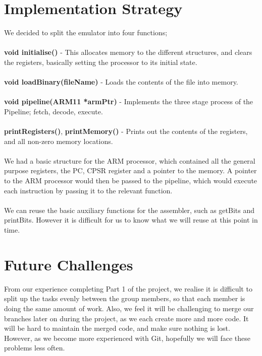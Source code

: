 \documentclass[11pt]{article}
\begin{document}
\section{Implementation Strategy}

We decided to split the emulator into four functions;
\\
\\
\noindent \textbf{void initialise()} - This allocates memory to the different structures, and clears the registers, basically setting the processor to its initial state.
\\
\\
\noindent\textbf{void loadBinary(fileName)} - Loads the contents of the file into memory.
\\
\\
\noindent \textbf{void pipeline(ARM11 *armPtr)} - Implements the three stage process of the Pipeline; fetch, decode, execute.
\\
\\
\noindent \textbf{printRegisters()}, \textbf{printMemory()} - Prints out the contents of the registers, and all non-zero memory locations.
\\
\\
We had a basic structure for the ARM processor, which contained all the general purpose registers, the PC, CPSR register and a pointer to the memory. A pointer to the ARM processor would then be passed to the pipeline, which would execute each instruction by passing it to the relevant function. 
\\
\\
We can reuse the basic auxiliary functions for the assembler, such as getBits and printBits. However it is difficult for us to know what we will reuse at this point in time. 

\section{Future Challenges}

From our experience completing Part 1 of the project, we realise it is difficult to split up the tasks evenly between the group members, so that each member is doing the same amount of work. Also, we feel it will be challenging to merge our branches later on during the project, as we each create more and more code. It will be hard to maintain the merged code, and make sure nothing is lost. However, as we become more experienced with Git, hopefully we will face these problems less often.
\end{document}
